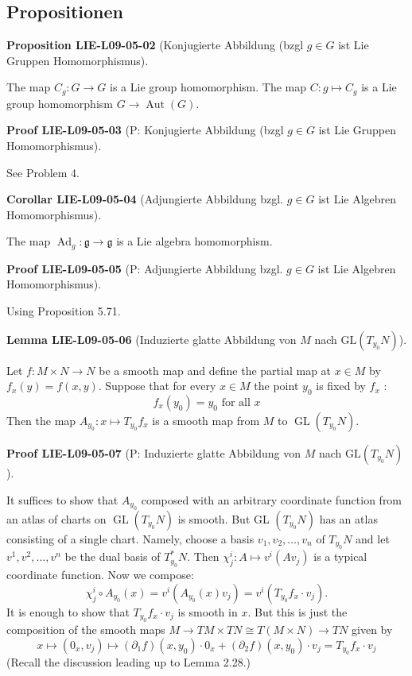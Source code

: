 \documentclass[10pt, letterpaper]{article}
\newcommand{\GL}{\mathrm{GL}}
\newcommand{\CustomHeading}[3]{%
  \par\medskip\noindent%
  \textbf{#1 #2} \textnormal{(#3)}.\enskip%
}
\newenvironment{PROP}[2]{\CustomHeading{Proposition}{#1}{#2}}{}
\newenvironment{LEM}[2]{\CustomHeading{Lemma}{#1}{#2}}{}
\newenvironment{KORO}[2]{\CustomHeading{Corollar}{#1}{#2}}{}
\newenvironment{PROOF}[2]{\CustomHeading{Proof}{#1}{#2}}{}
\begin{document}
\subsection{Propositionen}

\begin{PROP}{LIE-L09-05-02}{Konjugierte Abbildung (bzgl $g\in G$ ist Lie Gruppen Homomorphismus}
The map $C_{g}: G \rightarrow G$ is a Lie group homomorphism. The map $C: g \mapsto C_{g}$ is a Lie group homomorphism $G \rightarrow \operatorname{Aut}(G)$.
\end{PROP}

\begin{PROOF}{LIE-L09-05-03}{P: Konjugierte Abbildung (bzgl $g\in G$ ist Lie Gruppen Homomorphismus}
See Problem 4.
\end{PROOF}

\begin{KORO}{LIE-L09-05-04}{Adjungierte Abbildung bzgl. $g\in G$ ist Lie Algebren Homomorphismus}
The map $\operatorname{Ad}_{g}: \mathfrak{g} \rightarrow \mathfrak{g}$ is a Lie algebra homomorphism.
\end{KORO}

\begin{PROOF}{LIE-L09-05-05}{P: Adjungierte Abbildung bzgl. $g\in G$ ist Lie Algebren Homomorphismus}
Using Proposition 5.71.
\end{PROOF}

\begin{LEM}{LIE-L09-05-06}{Induzierte glatte Abbildung von $M$ nach $\GL(T_{y_0}N)$}
Let $f: M \times N \rightarrow N$ be a smooth map and define the partial map at $x \in M$ by $f_{x}(y)=f(x, y)$. Suppose that for every $x \in M$ the point $y_{0}$ is fixed by $f_{x}$ :
$$
f_{x}\left(y_{0}\right)=y_{0} \text { for all } x
$$
Then the map $A_{y_{0}}: x \mapsto T_{y_{0}} f_{x}$ is a smooth map from $M$ to $\operatorname{GL}\left(T_{y_{0}} N\right)$.
\end{LEM}

\begin{PROOF}{LIE-L09-05-07}{P: Induzierte glatte Abbildung von $M$ nach $\GL(T_{y_0}N)$}
It suffices to show that $A_{y_{0}}$ composed with an arbitrary coordinate function from an atlas of charts on $\operatorname{GL}\left(T_{y_{0}} N\right)$ is smooth. But GL $\left(T_{y_{0}} N\right)$ has an atlas consisting of a single chart. Namely, choose a basis $v_{1}, v_{2}, \ldots, v_{n}$ of $T_{y_{0}} N$ and let $v^{1}, v^{2}, \ldots, v^{n}$ be the dual basis of $T_{y_{0}}^{*} N$. Then $\chi_{j}^{i}: A \mapsto v^{i}\left(A v_{j}\right)$ is a typical coordinate function. Now we compose:
$$
\chi_{j}^{i} \circ A_{y_{0}}(x)=v^{i}\left(A_{y_{0}}(x) v_{j}\right)=v^{i}\left(T_{y_{0}} f_{x} \cdot v_{j}\right) .
$$
It is enough to show that $T_{y_{0}} f_{x} \cdot v_{j}$ is smooth in $x$. But this is just the composition of the smooth maps $M \rightarrow T M \times T N \cong T(M \times N) \rightarrow T N$ given by
$$
x \mapsto\left(0_{x}, v_{j}\right) \mapsto\left(\partial_{1} f\right)\left(x, y_{0}\right) \cdot 0_{x}+\left(\partial_{2} f\right)\left(x, y_{0}\right) \cdot v_{j}=T_{y_{0}} f_{x} \cdot v_{j}
$$
(Recall the discussion leading up to Lemma 2.28.)
\end{PROOF}
\end{document}
